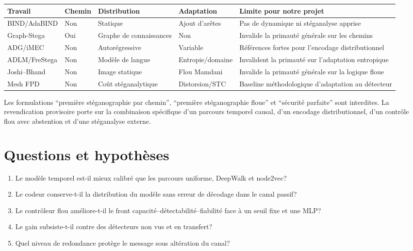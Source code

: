 \documentclass[11pt,a4paper]{article}
\begin{document}
\begingroup
\footnotesize
\setlength{\tabcolsep}{3pt}
\begin{tabularx}{0.96\textwidth}{@{}YYYYY@{}}
\toprule
Travail & Chemin & Distribution & Adaptation & Limite pour notre projet \\
\midrule
BIND/AdaBIND & Non & Statique & Ajout d'arêtes & Pas de dynamique ni
stéganalyse apprise \\
Graph-Stega & Oui & Graphe de connaissances & Non & Invalide la primauté
générale sur les chemins \\
ADG/iMEC & Non & Autorégressive & Variable & Références fortes pour
l'encodage distributionnel \\
ADLM/FreStega & Non & Modèle de langue & Entropie/domaine & Invalident la
primauté sur l'adaptation entropique \\
Joshi--Bhand & Non & Image statique & Flou Mamdani & Invalide la primauté
générale sur la logique floue \\
Mesh FPD & Non & Coût stéganalytique & Distorsion/STC & Baseline
méthodologique d'adaptation au détecteur \\
\bottomrule
\end{tabularx}
\endgroup

Les formulations ``première stéganographie par chemin'', ``première
stéganographie floue'' et ``sécurité parfaite'' sont interdites. La
revendication provisoire porte sur la combinaison spécifique d'un parcours
temporel causal, d'un encodage distributionnel, d'un contrôle flou avec
abstention et d'une stéganalyse externe.

\section{Questions et hypothèses}

\begin{enumerate}
\item Le modèle temporel est-il mieux calibré que les parcours uniforme,
DeepWalk et node2vec?
\item Le codeur conserve-t-il la distribution du modèle sans erreur de
décodage dans le canal passif?
\item Le contrôleur flou améliore-t-il le front
capacité--détectabilité--fiabilité face à un seuil fixe et une MLP?
\item Le gain subsiste-t-il contre des détecteurs non vus et en transfert?
\item Quel niveau de redondance protège le message sous altération du canal?
\end{enumerate}
\end{document}
